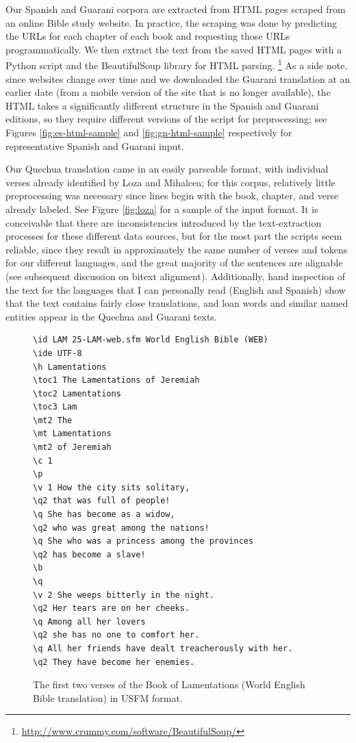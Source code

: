 Our Spanish and Guarani corpora are extracted from HTML pages scraped from an
online Bible study website. In practice, the scraping was done by predicting
the URLs for each chapter of each book and requesting those URLs
programmatically. We then extract the text from the saved HTML pages with a
Python script and the BeautifulSoup library for HTML parsing.
\footnote{\url{http://www.crummy.com/software/BeautifulSoup/}}
As a side note, since websites change over time and we
downloaded the Guarani translation at an earlier date (from a mobile version of
the site that is no longer available), the HTML takes a significantly different
structure in the Spanish and Guarani editions, so they require different
versions of the script for preprocessing; see Figures \ref{fig:es-html-sample}
and \ref{fig:gn-html-sample} respectively for representative Spanish and
Guarani input.

Our Quechua translation came in an easily parseable format, with individual
verses already identified by Loza and Mihalcea; for this corpus, relatively
little preprocessing was necessary since lines begin with the book, chapter,
and verse already labeled. See Figure \ref{fig:loza} for a sample of the input
format.
It is conceivable that there are inconsistencies introduced by the
text-extraction processes for these different data sources, but for the most
part the scripts seem reliable, since they result in approximately the same
number of verses and tokens for our different languages, and the great majority
of the sentences are alignable (see subsequent discussion on bitext alignment).
Additionally, hand inspection of the text for the languages that I can
personally read (English and Spanish) show that the text contains fairly close
translations, and loan words and similar named entities appear in the Quechua
and Guarani texts.

\begin{figure}
\raggedright \begin{verbatim}
\id LAM 25-LAM-web.sfm World English Bible (WEB) 
\ide UTF-8
\h Lamentations 
\toc1 The Lamentations of Jeremiah 
\toc2 Lamentations 
\toc3 Lam 
\mt2 The 
\mt Lamentations 
\mt2 of Jeremiah 
\c 1  
\p
\v 1 How the city sits solitary, 
\q2 that was full of people! 
\q She has become as a widow, 
\q2 who was great among the nations! 
\q She who was a princess among the provinces 
\q2 has become a slave! 
\b
\q
\v 2 She weeps bitterly in the night. 
\q2 Her tears are on her cheeks. 
\q Among all her lovers 
\q2 she has no one to comfort her. 
\q All her friends have dealt treacherously with her. 
\q2 They have become her enemies. 
\end{verbatim}
  \caption{The first two verses of the Book of Lamentations (World English
  Bible translation) in USFM format.}
  \label{fig:usfmsample}
\end{figure}

